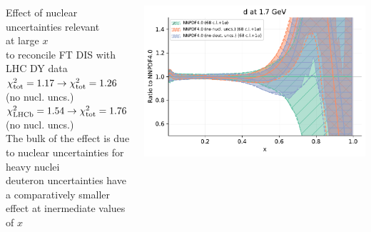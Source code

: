 \documentclass{beamer}
\begin{document}
\begin{frame}
\begin{columns}[c]
  \begin{column}{0.5\textwidth}
   \centering
   Effect of nuclear uncertainties relevant\\ at large $x$\\
   to reconcile FT DIS with LHC DY data\\
   \vspace{0.1cm}
   {\scriptsize $\chi^2_{\rm tot}=1.17\to \chi^2_{\rm tot}=1.26$ (no nucl. uncs.)}\\
   {\scriptsize $\chi^2_{\rm LHCb}=1.54\to \chi^2_{\rm tot}=1.76$ (no nucl. uncs.)}\\
   \vspace{0.2cm}
   The bulk of the effect is due to nuclear uncertainties for heavy nuclei\\
   {\scriptsize deuteron uncertainties have a comparatively smaller effect at inermediate values of $x$}\\
  \end{column}
  \begin{column}{0.5\textwidth}
   \centering
   \includegraphics[width=\columnwidth]{plots/nuclear_d}\\   
  \end{column}
 \end{columns}
\end{frame}
\end{document}
